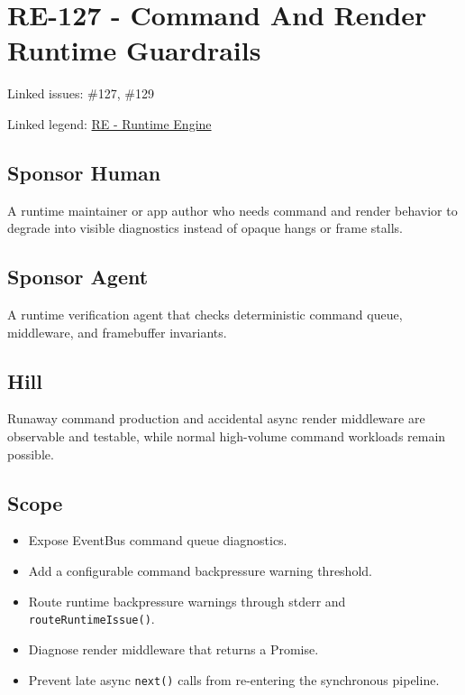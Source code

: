 \chapter{RE-127 - Command And Render Runtime Guardrails}\label{record-166}

\smallskip

Linked issues: \#127, \#129

Linked legend: \href{https://github.com/flyingrobots/bijou/blob/1853ad902f6bf219326409e7f743a5a1d6517dbc/docs/legends/RE-runtime-engine.md}{RE - Runtime Engine}

\section{Sponsor Human}\label{record-166-sponsor-human}

A runtime maintainer or app author who needs command and render behavior to degrade into visible diagnostics instead of opaque hangs or frame stalls.

\section{Sponsor Agent}\label{record-166-sponsor-agent}

A runtime verification agent that checks deterministic command queue, middleware, and framebuffer invariants.

\section{Hill}\label{record-166-hill}

Runaway command production and accidental async render middleware are observable and testable, while normal high-volume command workloads remain possible.

\section{Scope}\label{record-166-scope}

\begin{itemize}
\tightlist
\item
  Expose EventBus command queue diagnostics.
\item
  Add a configurable command backpressure warning threshold.
\item
  Route runtime backpressure warnings through stderr and \texttt{r\allowbreak{}o\allowbreak{}u\allowbreak{}t\allowbreak{}e\allowbreak{}R\allowbreak{}u\allowbreak{}n\allowbreak{}t\allowbreak{}i\allowbreak{}m\allowbreak{}e\allowbreak{}I\allowbreak{}s\allowbreak{}s\allowbreak{}u\allowbreak{}e\allowbreak{}(\allowbreak{})}.
\item
  Diagnose render middleware that returns a Promise.
\item
  Prevent late async \texttt{n\allowbreak{}e\allowbreak{}x\allowbreak{}t\allowbreak{}(\allowbreak{})} calls from re-entering the synchronous pipeline.
\end{itemize}

